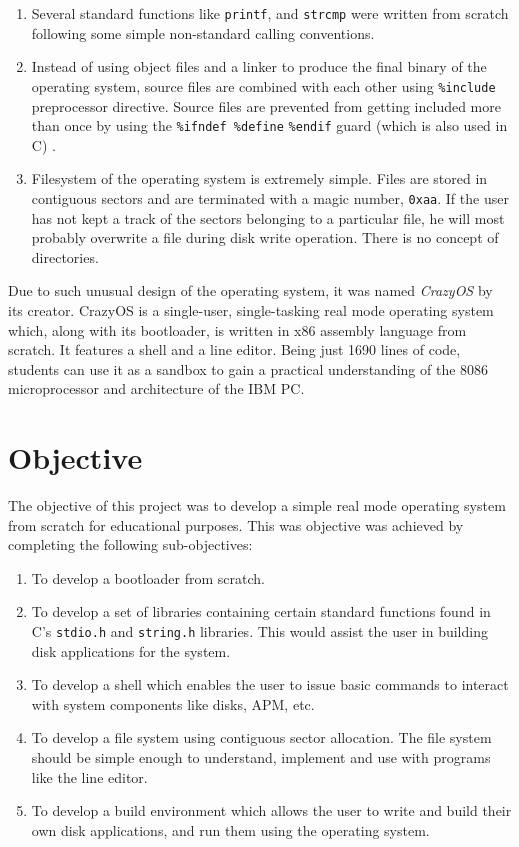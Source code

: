 \begin{enumerate}
\item Several standard functions like \verb|printf|, and \verb|strcmp| were written from scratch following some simple non-standard calling conventions.
\item Instead of using object files and a linker to produce the final binary of the operating system, source files are combined with each other using \verb|%include| preprocessor directive. Source files are prevented from getting included more than once by using the \verb|%ifndef %define| \verb|%endif| guard (which is also used in C) \cite{nasm2015doc}.
\item Filesystem of the operating system is extremely simple. Files are stored in contiguous sectors and are terminated with a magic number, \verb|0xaa|. If the user has not kept a track of the sectors belonging to a particular file, he will most probably overwrite a file during disk write operation. There is no concept of directories.   
\end{enumerate}
Due to such unusual design of the operating system, it was named \textit{CrazyOS} by its creator.
CrazyOS is a single-user, single-tasking real mode operating system which, along with its bootloader, is written in x86 assembly language from scratch. It features a shell and a line editor. Being just 1690 lines of code, students can use it as a sandbox to gain a practical understanding of the 8086 microprocessor and architecture of the IBM PC.



\section{Objective}
The objective of this project was to develop a simple real mode operating system from scratch for educational purposes. This was objective was achieved by completing the following sub-objectives:
\begin{enumerate}
\item To develop a bootloader from scratch.
\item To develop a set of libraries containing certain standard functions found in C's \verb|stdio.h| and \verb|string.h| libraries. This would assist the user in building disk applications for the system.
\item To develop a shell which enables the user to issue basic commands to interact with system components like disks, APM, etc.
\item To develop a file system using contiguous sector allocation. The file system should be simple enough to understand, implement and use with programs like the line editor.
\item To develop a build environment which allows the user to write and build their own disk applications, and run them using the operating system.
\end{enumerate}

